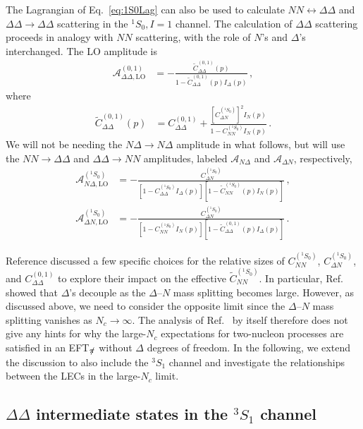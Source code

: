 \documentclass[nofootinbib, preprint, aps, prc, superscriptaddress,11pt]{revtex4-1}
\newcommand{\Nc}{\ensuremath{N_c}\xspace}
\newcommand{\NN}{\ensuremath{N\!N}\xspace}
\newcommand{\oneS}{\ensuremath{{{}^{1}\!S_0}}\xspace}
\newcommand{\threeS}{\ensuremath{{{}^{3}\!S_1}}\xspace}
\newcommand{\calA}{\ensuremath{\mathcal{A}}}
\newcommand{\1}{\mathbbm{1}}
\newcommand{\CNNsing}{\ensuremath{C_{\NN}^{(^1 \! S_0)}}\xspace}
\newcommand{\CNDsing}{\ensuremath{C_{\Delta N}^{(^1 \! S_0)}}\xspace}
\newcommand{\CDDsing}{\ensuremath{C_{\Delta\Delta}^{(0,1)}}\xspace}
\newcommand{\CeffSing}{\ensuremath{\widetilde C_{\NN}^{(\oneS)}}\xspace}
\newcommand{\CDDeffSing}{\ensuremath{\widetilde C_{\Delta\Delta}^{(0,1)}}\xspace}
\newcommand{\nopi}{\ensuremath{\pi\hskip-0.40em /}}
\newcommand{\eftnopi}{EFT$_{\nopi}$\xspace}
\newcommand{\D}{\ensuremath{\Delta}\xspace}
\newcommand{\DD}{\ensuremath{\Delta\Delta}\xspace}
\begin{document}
The Lagrangian of Eq.~\eqref{eq:1S0Lag} can also be used to calculate $\NN \leftrightarrow \DD$ and $\DD\to\DD$ scattering in the $\oneS, I=1$ channel. The calculation of \DD scattering proceeds in analogy with \NN scattering, with the role of $N$'s and \D's interchanged. The LO amplitude is 
    \begin{align}\label{A01Del}
        \calA^{(0,1)}_{\DD, \text{LO}} & = - \frac{ \CDDeffSing(p) }{ 1 - \CDDeffSing(p) I_{\D}(p)} \, ,
    \end{align}
where
    \begin{align}
     \label{CtripDel}\CDDeffSing(p) & = \CDDsing + \frac{ \left[ C_{\Delta N}^{(\oneS)}\right]^2 I_{N}(p)  }{1 - C_{\NN}^{(\oneS)} I_{N}(p)} \, .
    \end{align}
We will not be needing the $N\D \to N\D$ amplitude in what follows, but will use the $\NN \to \DD$ and $\DD \to \NN$ amplitudes, labeled $\calA_{N\D}$ and $\calA_{\D N}$, respectively, 
    \begin{align}
    \label{eq:ANDsing}
        \calA^{(\oneS)}_{N\D, \text{LO}} & = - \frac{C^{(\oneS)}_{\Delta N}}{ \left[ 1 - C_{\DD}^{(\oneS)} I_{\D}(p) \right] \left[ 1 - \CeffSing(p) I_{N}(p) \right] } \, , \\
    \label{eq:ADNsing}
        \calA^{(\oneS)}_{\D N, \text{LO}} & = - \frac{C^{(\oneS)}_{\Delta N}}{ \left[ 1 - C_{\NN}^{(\oneS)} I_{N}(p) \right] \left[ 1 - \CDDeffSing(p) I_{\D}(p) \right] } \, .
    \end{align}


Reference \cite{Savage:1996tb} discussed a few specific choices for the relative sizes of \CNNsing, \CNDsing, and \CDDsing to explore their impact on the effective \CeffSing. 
In particular, Ref.~\cite{Savage:1996tb} showed that {\D}'s decouple as the \D{}--$N$ mass splitting becomes large. 
However, as discussed above, we need to consider the opposite limit since the \D{}--$N$ mass splitting vanishes as $\Nc \to \infty$. The analysis of Ref.~\cite{Savage:1996tb} by itself therefore does not give any hints for why the large-\Nc expectations for two-nucleon processes are satisfied in an \eftnopi without \D degrees of freedom.
In the following, we extend the discussion to also include the $\threeS$ channel and investigate the relationships between the LECs in the large-\Nc limit.

\subsection{\DD intermediate states in the \threeS channel}
\label{sec:DDIntThreeS}
\end{document}
